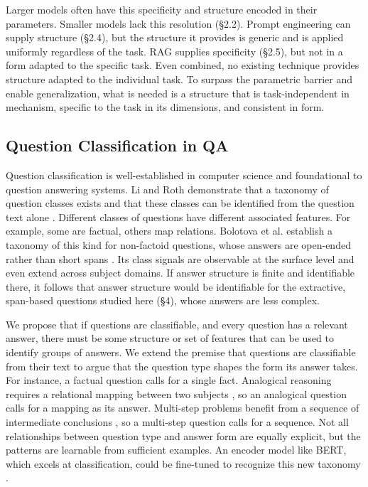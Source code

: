 \documentclass{article}
\begin{document}
Larger models often have this specificity and structure encoded in their parameters. Smaller models lack this resolution (\S2.2). Prompt engineering can supply structure (\S2.4), but the structure it provides is generic and is applied uniformly regardless of the task. RAG supplies specificity (\S2.5), but not in a form adapted to the specific task. Even combined, no existing technique provides structure adapted to the individual task. To surpass the parametric barrier and enable generalization, what is needed is a structure that is task-independent in mechanism, specific to the task in its dimensions, and consistent in form.

\subsection{Question Classification in QA}


Question classification is well-established in computer science and foundational to question answering systems. Li and Roth demonstrate that a taxonomy of question classes exists and that these classes can be identified from the question text alone \cite{liroth2002questions}. Different classes of questions have different associated features. For example, some are factual, others map relations. Bolotova et al. establish a taxonomy of this kind for non-factoid questions, whose answers are open-ended rather than short spans \cite{nonfactoid_taxonomy2022}. Its class signals are observable at the surface level and even extend across subject domains. If answer structure is finite and identifiable there, it follows that answer structure would be identifiable for the extractive, span-based questions studied here (\S4), whose answers are less complex.

We propose that if questions are classifiable, and every question has a relevant answer, there must be some structure or set of features that can be used to identify groups of answers. We extend the premise that questions are classifiable from their text \cite{liroth2002questions} to argue that the question type shapes the form its answer takes. For instance, a factual question calls for a single fact. Analogical reasoning requires a relational mapping between two subjects \cite{analogical_reasoning2022}, so an analogical question calls for a mapping as its answer. Multi-step problems benefit from a sequence of intermediate conclusions \cite{wei2022cot}, so a multi-step question calls for a sequence. Not all relationships between question type and answer form are equally explicit, but the patterns are learnable from sufficient examples. An encoder model like BERT, which excels at classification, could be fine-tuned to recognize this new taxonomy \cite{devlin2019bert, xu2019qc_bert}.
\end{document}
